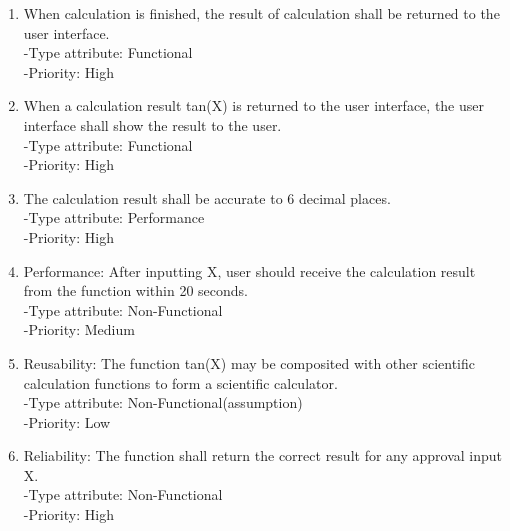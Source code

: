 \documentclass[12pt]{article}
\begin{document}
\begin{enumerate}
\item	When calculation is finished, the result of calculation shall be returned to the user interface.	\\
-Type attribute: Functional\\
-Priority: High\\

\item	When a calculation result tan(X) is returned to the user interface, the user interface shall show the result to the user.\\
-Type attribute: Functional\\
-Priority: High\\

\item	The calculation result shall be accurate to 6 decimal places.\\
-Type attribute: Performance\\
-Priority: High\\

\item	Performance:
After inputting X, user should receive the calculation result from the function within 20 seconds.\\
-Type attribute: Non-Functional\\
-Priority: Medium\\

\item	Reusability:
The function tan(X) may be composited with other scientific calculation functions to form a scientific calculator.\\
-Type attribute: Non-Functional(assumption)\\
-Priority: Low\\

\item	Reliability:
The function shall return the correct result for any approval input X.\\	-Type attribute: Non-Functional\\
-Priority: High\\

\end{enumerate}
\end{document}
